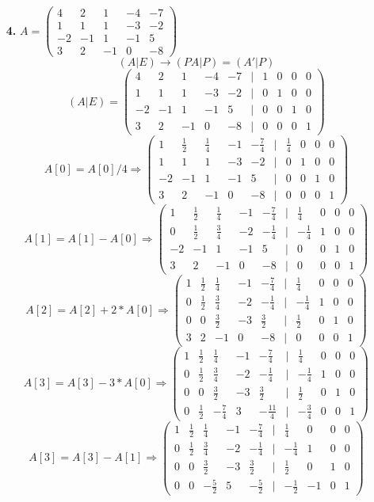 \documentclass[a4paper]{article}
\newcommand{\mat}[1]{\begin{pmatrix} #1 \end{pmatrix}}
\renewcommand{\r}{\Rightarrow}
\begin{document}
\begin{enumerate}
    \item[\textbf{4.}]$A = \mat{4 & 2 & 1 & -4 & -7 \\ 1 & 1 & 1 & -3 &-2 \\ -2 & -1 & 1 & -1 & 5 \\ 3 & 2 & -1 & 0 & -8}$
    $$(A|E) \to (PA|P) = (A'|P)$$
    {\small
        $$(A|E) = \mat{4 & 2 & 1 & -4 & -7 & | & 1 & 0 & 0 & 0 \\ 1 & 1 & 1 & -3 &-2 & | & 0 & 1 & 0 & 0\\ -2 & -1 & 1 & -1 & 5& | & 0 & 0 & 1 & 0 \\ 3 & 2 & -1 & 0 & -8 & | & 0 & 0 & 0 & 1}$$
        $$A[0] = A[0]/4 \r \mat{1 & \frac{1}{2} & \frac{1}{4} & -1 & -\frac{7}{4} & | & \frac{1}{4} & 0 & 0 & 0 \\ 1 & 1 & 1 & -3 & -2 & | & 0 & 1 & 0 & 0 \\ -2 & -1 & 1 & -1 & 5 & | & 0 & 0 & 1 & 0 \\ 3 & 2 & -1 & 0 & -8 & | & 0 & 0 & 0 & 1}$$    
        $$A[1] = A[1]-A[0] \r \mat{1 & \frac{1}{2} & \frac{1}{4} & -1 & -\frac{7}{4} & | & \frac{1}{4} & 0 & 0 & 0 \\ 0 & \frac{1}{2} & \frac{3}{4} & -2 & -\frac{1}{4} & | & -\frac{1}{4} & 1 & 0 & 0 \\ -2 & -1 & 1 & -1 & 5 & | & 0 & 0 & 1 & 0 \\ 3 & 2 & -1 & 0 & -8 & | & 0 & 0 & 0 & 1}$$
        $$A[2] = A[2]+2*A[0] \r \mat{1 & \frac{1}{2} & \frac{1}{4} & -1 & -\frac{7}{4} & | & \frac{1}{4} & 0 & 0 & 0 \\ 0 & \frac{1}{2} & \frac{3}{4} & -2 & -\frac{1}{4} & | & -\frac{1}{4} & 1 & 0 & 0 \\ 0 & 0 & \frac{3}{2} & -3 & \frac{3}{2} & | & \frac{1}{2} & 0 & 1 & 0 \\ 3 & 2 & -1 & 0 & -8 & | & 0 & 0 & 0 & 1}$$
        $$A[3] = A[3]-3*A[0] \r \mat{1 & \frac{1}{2} & \frac{1}{4} & -1 & -\frac{7}{4} & | & \frac{1}{4} & 0 & 0 & 0 \\ 0 & \frac{1}{2} & \frac{3}{4} & -2 & -\frac{1}{4} & | & -\frac{1}{4} & 1 & 0 & 0 \\ 0 & 0 & \frac{3}{2} & -3 & \frac{3}{2} & | & \frac{1}{2} & 0 & 1 & 0 \\ 0 & \frac{1}{2} & -\frac{7}{4} & 3 & -\frac{11}{4} & | & -\frac{3}{4} & 0 & 0 & 1}$$
        $$A[3] = A[3] - A[1] \r \mat{1 & \frac{1}{2} & \frac{1}{4} & -1 & -\frac{7}{4} & | & \frac{1}{4} & 0 & 0 & 0 \\ 0 & \frac{1}{2} & \frac{3}{4} & -2 & -\frac{1}{4} & | & -\frac{1}{4} & 1 & 0 & 0 \\ 0 & 0 & \frac{3}{2} & -3 & \frac{3}{2} & | & \frac{1}{2} & 0 & 1 & 0 \\ 0 & 0 & -\frac{5}{2} & 5 & -\frac{5}{2} & | & -\frac{1}{2} & -1 & 0 & 1}$$
}
\end{enumerate}
\end{document}
